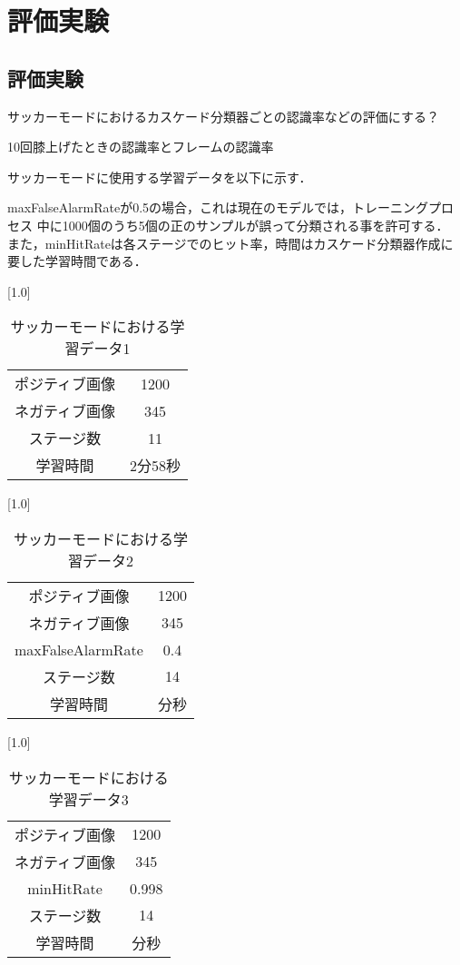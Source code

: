 \chapter{評価実験}
\thispagestyle{fancy}


\section{評価実験}
サッカーモードにおけるカスケード分類器ごとの認識率などの評価にする？

10回膝上げたときの認識率とフレームの認識率


サッカーモードに使用する学習データを以下に示す．

maxFalseAlarmRateが0.5の場合，これは現在のモデルでは，トレーニングプロセス
中に1000個のうち5個の正のサンプルが誤って分類される事を許可する．
また，minHitRateは各ステージでのヒット率，時間はカスケード分類器作成に要した学習時間である．

\vspace{1cm}

\begin{table}[h]
  \centering
  \scalebox{1.0}[1.0]{
   \begin{tabular}{cc}	\hline
     ポジティブ画像 & 1200  \\    
     ネガティブ画像 & 345  \\
     ステージ数 & 11  \\ 
     学習時間 & 2分58秒  \\ \hline
   \end{tabular}
  } 
  \caption{サッカーモードにおける学習データ1}
  \label{soccerstudy}
\end{table}


\begin{table}[h]
  \centering
  \scalebox{1.0}[1.0]{
   \begin{tabular}{cc}	\hline
     ポジティブ画像 & 1200  \\    
     ネガティブ画像 & 345  \\
     maxFalseAlarmRate & 0.4 \\
     ステージ数 & 14  \\ 
     学習時間 & 分秒  \\ \hline
   \end{tabular}
  } 
  \caption{サッカーモードにおける学習データ2}
  \label{soccerstudy}
\end{table}


\begin{table}[h]
  \centering
  \scalebox{1.0}[1.0]{
   \begin{tabular}{cc}	\hline
     ポジティブ画像 & 1200  \\    
     ネガティブ画像 & 345  \\
     minHitRate & 0.998 \\
     ステージ数 & 14  \\ 
     学習時間 & 分秒  \\ \hline
   \end{tabular}
  } 
  \caption{サッカーモードにおける学習データ3}
  \label{soccerstudy}
\end{table}



